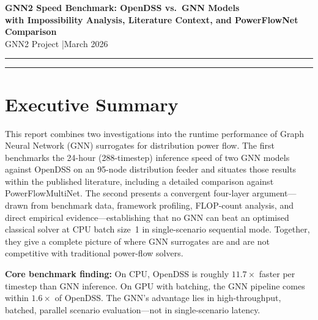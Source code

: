 \documentclass[11pt]{article}
\begin{document}
\begin{center}
  {\LARGE\bfseries\color{headerblue}
    GNN2 Speed Benchmark: OpenDSS vs.\ GNN Models\\[4pt]
    with Impossibility Analysis, Literature Context, and PowerFlowNet Comparison}\\[6pt]
  {\large GNN2 Project \quad|\quad March 2026}
\end{center}

\vspace{4pt}
\noindent\textcolor{ruleblue}{\rule{\linewidth}{1.2pt}}
\vspace{10pt}

\tableofcontents
\vspace{14pt}
\noindent\textcolor{ruleblue}{\rule{\linewidth}{0.6pt}}
\vspace{10pt}

\section{Executive Summary}

This report combines two investigations into the runtime performance of Graph Neural
Network (GNN) surrogates for distribution power flow.  The first benchmarks the
24-hour (288-timestep) inference speed of two GNN models against OpenDSS on an
95-node distribution feeder and situates those results within the published literature,
including a detailed comparison against PowerFlowMultiNet.  The second presents a
convergent four-layer argument---drawn from benchmark data, framework profiling,
FLOP-count analysis, and direct empirical evidence---establishing that no GNN can
beat an optimised classical solver at CPU batch size~1 in single-scenario sequential
mode.  Together, they give a complete picture of where GNN surrogates are and are not
competitive with traditional power-flow solvers.

\medskip
\noindent\textbf{Core benchmark finding:}
On CPU, OpenDSS is roughly $11.7\times$ faster per timestep than GNN inference.
On GPU with batching, the GNN pipeline comes within $1.6\times$ of OpenDSS.
The GNN's advantage lies in high-throughput, batched, parallel scenario
evaluation---not in single-scenario latency.
\end{document}
